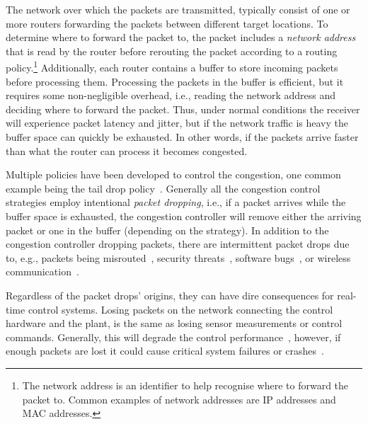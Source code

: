 The network over which the packets are transmitted, typically consist of one or more routers forwarding the packets between different target locations.
To determine where to forward the packet to, the packet includes a \emph{network address} that is read by the router before rerouting the packet according to a routing policy.\footnote{The network address is an identifier to help recognise where to forward the packet to. Common examples of network addresses are IP addresses and MAC addresses.}
Additionally, each router contains a buffer to store incoming packets before processing them.
Processing the packets in the buffer is efficient, but it requires some non-negligible overhead, i.e., reading the network address and deciding where to forward the packet.
Thus, under normal conditions the receiver will experience packet latency and jitter, but if the network traffic is heavy the buffer space can quickly be exhausted.
In other words, if the packets arrive faster than what the router can process it becomes congested.

Multiple policies have been developed to control the congestion, one common example being the tail drop policy~\cite{Comer:2013}.
Generally all the congestion control strategies employ intentional \emph{packet dropping}, i.e., if a packet arrives while the buffer space is exhausted, the congestion controller will remove either the arriving packet or one in the buffer (depending on the strategy).
In addition to the congestion controller dropping packets, there are intermittent packet drops due to, e.g., packets being misrouted~\cite{Bradley:1998}, security threats~\cite{Hansman:2005}, software bugs~\cite{Mai:2011}, or wireless communication~\cite{Zhu:2021}.

Regardless of the packet drops' origins, they can have dire consequences for real-time control systems.
Losing packets on the network connecting the control hardware and the plant, is the same as losing sensor measurements or control commands.
Generally, this will degrade the control performance~\cite{Nilsson:1998b}, however, if enough packets are lost it could cause critical system failures or crashes~\cite{Xiong:2007}.

